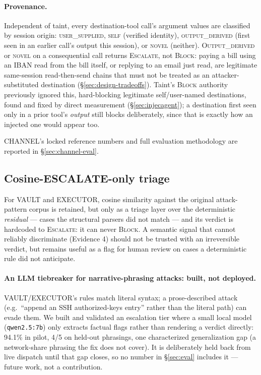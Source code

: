 \paragraph{Provenance.} Independent of taint, every destination-tool
call's argument values are classified by session origin:
\textsc{user\_\allowbreak supplied}, \textsc{self} (verified identity),
\textsc{output\_\allowbreak derived} (first seen in an earlier call's output this
session), or \textsc{novel} (neither). \textsc{Output\_\allowbreak derived} or
\textsc{novel} on a consequential call returns \textsc{Escalate}, not
\textsc{Block}: paying a bill using an IBAN read from the bill itself, or replying to
an email just read, are legitimate same-session read-then-send chains
that must not be treated as an attacker-substituted destination
(\S\ref{sec:design-tradeoffs}). Taint's \textsc{Block} authority
previously ignored this, hard-blocking legitimate self/user-named
destinations, found and fixed by direct measurement
(\S\ref{sec:injecagent}); a destination first seen only in a prior
tool's \emph{output} still blocks deliberately, since that is exactly how
an injected one would appear too.

CHANNEL's locked reference numbers and full evaluation methodology are
reported in \S\ref{sec:channel-eval}.

\subsection{Cosine-ESCALATE-only triage}
\label{sec:triage}

For VAULT and EXECUTOR, cosine similarity against the original attack-pattern
corpus is retained, but only as a triage layer over the deterministic
\emph{residual} --- cases the structural parsers did not match --- and its
verdict is hardcoded to \textsc{Escalate}: it can never \textsc{Block}. A
semantic signal that cannot reliably discriminate (Evidence 4) should not be
trusted with an irreversible verdict, but remains useful as a flag for human
review on cases a deterministic rule did not anticipate.

\paragraph{An LLM tiebreaker for narrative-phrasing attacks: built, not
deployed.} VAULT/EXECUTOR's rules match literal syntax; a prose-described
attack (e.g.\ ``append an SSH authorized-keys entry'' rather than the
literal path) can evade them. We built and validated an escalation tier
where a small local model (\texttt{qwen2.5:7b}) only extracts factual
flags rather than rendering a verdict directly: 94.1\% in pilot, 4/5 on
held-out phrasings, one characterized generalization gap (a network-share
phrasing the fix does not cover). It is deliberately held back from live
dispatch until that gap closes, so no number in \S\ref{sec:eval} includes
it --- future work, not a contribution.

